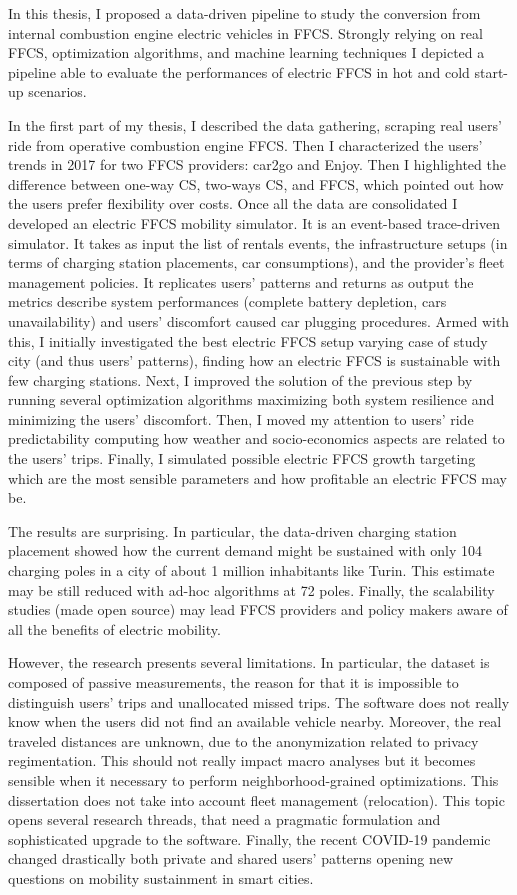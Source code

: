 In this thesis, I proposed a data-driven pipeline to study the conversion from internal combustion engine electric vehicles in FFCS. Strongly relying on real FFCS, optimization algorithms, and machine learning techniques I depicted a pipeline able to evaluate the performances of electric FFCS in hot and cold start-up scenarios. 

In the first part of my thesis, I described the data gathering, scraping real users' ride from operative combustion engine FFCS. Then I characterized the users' trends in 2017 for two FFCS providers: car2go and Enjoy. Then I highlighted the difference between one-way CS, two-ways CS, and FFCS, which pointed out how the users prefer flexibility over costs. Once all the data are consolidated I developed an electric FFCS mobility simulator. It is an event-based trace-driven simulator. It takes as input the list of rentals events, the infrastructure setups (in terms of charging station placements, car consumptions), and the provider's fleet management policies. It replicates users' patterns and returns as output the metrics describe system performances (complete battery depletion, cars unavailability) and users' discomfort caused car plugging procedures. Armed with this, I initially investigated the best electric FFCS setup varying case of study city (and thus users' patterns), finding how an electric FFCS is sustainable with few charging stations. Next, I improved the solution of the previous step by running several optimization algorithms maximizing both system resilience and minimizing the users' discomfort. Then, I moved my attention to users' ride predictability computing how weather and socio-economics aspects are related to the users' trips. Finally, I simulated possible electric FFCS growth targeting which are the most sensible parameters and how profitable an electric FFCS may be.

The results are surprising. In particular, the data-driven charging station placement showed how the current demand might be sustained with only 104 charging poles in a city of about 1 million inhabitants like Turin. This estimate may be still reduced with ad-hoc algorithms at 72 poles. Finally, the scalability studies (made open source) may lead FFCS providers and policy makers aware of all the benefits of electric mobility.

However, the research presents several limitations. In particular, the dataset is composed of passive measurements, the reason for that it is impossible to distinguish users' trips and unallocated missed trips. The software does not really know when the users did not find an available vehicle nearby. Moreover, the real traveled distances are unknown, due to the anonymization related to privacy regimentation. This should not really impact macro analyses but it becomes sensible when it necessary to perform neighborhood-grained optimizations. This dissertation does not take into account fleet management (relocation). This topic opens several research threads, that need a pragmatic formulation and sophisticated upgrade to the software. Finally, the recent COVID-19 pandemic changed drastically both private and shared users' patterns opening new questions on mobility sustainment in smart cities.

